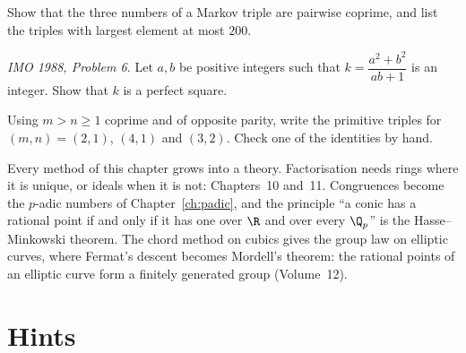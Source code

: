 \begin{exercise}[$\star\star$]\label{ex:markovcoprime}
Show that the three numbers of a Markov triple are pairwise coprime, and list the triples with largest element at most $200$.
\end{exercise}

\begin{exercise}[$\star\star\star$]\label{ex:imo88}
\emph{IMO 1988, Problem 6.} Let $a,b$ be positive integers such that $k=\dfrac{a^2+b^2}{ab+1}$ is an integer. Show that $k$ is a perfect square.
\end{exercise}

\begin{exercise}[$\star$]\label{ex:t1-triple}
Using $m>n\ge 1$ coprime and of opposite parity, write the primitive triples for $(m,n)=(2,1)$, $(4,1)$ and $(3,2)$. Check one of the identities by hand.
\end{exercise}

\begin{beauty}
Every method of this chapter grows into a theory. Factorisation needs rings where it is unique, or ideals when it is not: Chapters~10 and~11. Congruences become the $p$-adic numbers of Chapter~\ref{ch:padic}, and the principle ``a conic has a rational point if and only if it has one over $\R$ and over every $\Q_p$'' is the Hasse--Minkowski theorem. The chord method on cubics gives the group law on elliptic curves, where Fermat's descent becomes Mordell's theorem: the rational points of an elliptic curve form a finitely generated group (Volume~12).
\end{beauty}

\section{Hints}

